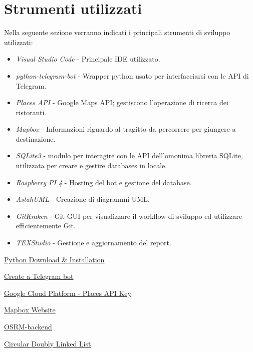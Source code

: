 \documentclass[a4paper, 12pt]{article}
\begin{document}
	\newpage
	\section{Strumenti utilizzati}
	Nella seguente sezione verranno indicati i principali strumenti di sviluppo utilizzati:\\
	\begin{itemize}
		\setlength{\parskip}{0pt}
		\setlength{\parsep}{0pt}
		
		\item \emph{Visual Studio Code} - Principale IDE utilizzato.
		\item \emph{python-telegram-bot} - Wrapper python usato per interfacciarsi con le API di Telegram.
		\item \emph{Places API} - Google Maps API; gestiscono l'operazione di ricerca dei ristoranti.
		\item \emph{Mapbox} - Informazioni riguardo al tragitto da percorrere per giungere a destinazione.
		\item \emph{SQLite3} - modulo per interagire con le API dell'omonima libreria SQLite, utilizzata per creare e gestire databases in locale.
		\item \emph{Raspberry PI 4} - Hosting del bot e gestione del database.
		\item \emph{AstahUML} - Creazione di diagrammi UML.
		\item \emph{GitKraken} - Git GUI per visualizzare il workflow di sviluppo ed utilizzare efficientemente Git.
		\item \emph{TEXStudio} - Gestione e aggiornamento del report.
	\end{itemize}
	\newpage
	\begin{thebibliography}{99}
		\href{https://www.python.org/downloads/}{Python Download \& Installation}
		
		\href{https://sendpulse.com/knowledge-base/chatbot/create-telegram-chatbot}{Create a Telegram bot}
		
		\href{https://developers.google.com/maps/documentation/places/web-service/get-api-key}{Google Cloud Platform - Places API Key}
		
		\href{https://www.mapbox.com/}{Mapbox Website}
		
		\href{https://github.com/Project-OSRM/osrm-backend}{OSRM-backend}
		
		\href{https://pythonwife.com/circular-doubly-linked-list-in-python/#:~:text=A%20circular%20doubly%20linked%20list,tail%20node%20and%20vice%20versa.}{Circular Doubly Linked List}
		
	\end{thebibliography} 
\end{document}
